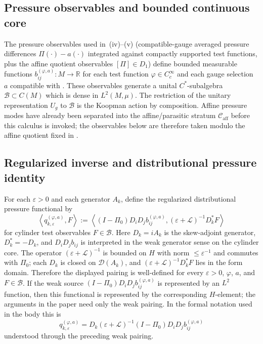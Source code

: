 \documentclass[11pt]{amsart}
\numberwithin{equation}{section}
\theoremstyle{plain}
\theoremstyle{definition}
\theoremstyle{remark}
\newcommand{\Caff}{\mathcal C_{\mathrm{aff}}}
\begin{document}
\subsection{Pressure observables and bounded continuous core}
The pressure observables used in
\,(iv)--(v) (compatible-gauge averaged
pressure differences \(\Pi(\cdot)-a(\cdot)\) integrated against compactly
supported test functions, plus the affine quotient observables
\([\Pi]\in D_1\)) define bounded measurable functions
\(b_{ij}^{(\varphi,a)}\colon M\to\mathbb R\) for each test function
\(\varphi\in C_c^\infty\) and each gauge selection \(a\) compatible with
.  These observables generate a
unital \(C^*\)-subalgebra
\(\mathcal B\subset C(M)\) which is dense in \(L^2(M,\mu)\).  The
restriction of the unitary representation \(U_g\) to \(\mathcal B\) is the
Koopman action by composition.
Affine pressure modes have already been separated into the
affine/parasitic stratum \(\Caff\) before this calculus is invoked; the
observables below are therefore taken modulo the affine quotient fixed in
.

\subsection{Regularized inverse and distributional pressure identity}
For each \(\varepsilon>0\) and each generator \(A_k\), define the
regularized distributional pressure functional by
\[
   \left\langle q_{k,\varepsilon}^{(\varphi,a)},F\right\rangle
   :=
   \left\langle
      (I-\Pi_0)D_iD_j b_{ij}^{(\varphi,a)},
      (\varepsilon+\mathcal L)^{-1}D_k^*F
   \right\rangle
\]
for cylinder test observables \(F\in\mathcal B\).  Here \(D_k=iA_k\) is the
skew-adjoint generator, \(D_k^*=-D_k\), and \(D_iD_jb_{ij}\) is interpreted in
the weak generator sense on the cylinder core.  The operator
\((\varepsilon+\mathcal L)^{-1}\) is bounded on \(H\) with
norm \(\le\varepsilon^{-1}\) and commutes with \(\Pi_0\); each \(D_k\) is
closed on \(\mathcal D(A_k)\), and
\((\varepsilon+\mathcal L)^{-1}D_k^*F\) lies in the form domain.  Therefore the
displayed pairing is well-defined for every \(\varepsilon>0\), \(\varphi\),
\(a\), and \(F\in\mathcal B\).  If the weak source
\((I-\Pi_0)D_iD_jb_{ij}^{(\varphi,a)}\) is represented by an \(L^2\) function,
then this functional is represented by the corresponding \(H\)-element; the
arguments in the paper need only the weak pairing.
In the formal notation used in the body this is
\[
   q_{k,\varepsilon}^{(\varphi,a)}
   =
   D_k(\varepsilon+\mathcal L)^{-1}
   (I-\Pi_0)D_iD_jb_{ij}^{(\varphi,a)}
\]
understood through the preceding weak pairing.
\end{document}

